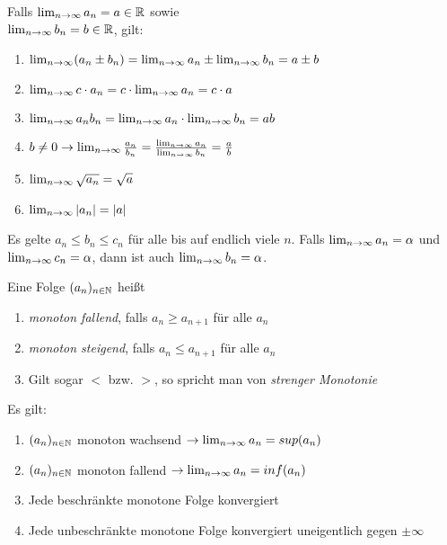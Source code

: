 \documentclass[]{article}
\begin{document}
\begin{satz}
	Falls $\lim_{n \rightarrow \infty} a_n = a \in \mathbb{R}$ sowie \\ $\lim_{n \rightarrow \infty} b_n = b \in \mathbb{R}$, gilt:
	\begin{enumerate}[noitemsep]
		\item $\lim_{n \rightarrow \infty} (a_n \pm b_n) = \lim_{n \rightarrow \infty} a_n \pm \lim_{n \rightarrow \infty} b_n = a \pm b $
		\item $\lim_{n \rightarrow \infty} c \cdot a_n = c \cdot \lim_{n \rightarrow \infty} a_n = c \cdot a  $
		\item $\lim_{n \rightarrow \infty} a_nb_n = \lim_{n \rightarrow \infty} a_n \cdot \lim_{n \rightarrow \infty} b_n = ab  $
		\item $b \neq 0 \rightarrow\lim_{n \rightarrow \infty} \frac{a_n}{b_n} = \frac{\lim_{n \rightarrow \infty} a_n}{\lim_{n \rightarrow \infty} b_n} = \frac{a}{b} $
		\item $\lim_{n \rightarrow \infty} \sqrt{a_n} = \sqrt{a} $
		\item $\lim_{n \rightarrow \infty} |a_n| = |a| $
	\end{enumerate}
\end{satz}

\begin{satz}[Einschließungsregel]
	Es gelte $a_n \leq b_n \leq c_n$ für alle bis auf endlich viele $n$. Falls $\lim_{n \rightarrow \infty} a_n = \alpha$ und $\lim_{n \rightarrow \infty} c_n = \alpha $, dann ist auch $\lim_{n \rightarrow \infty} b_n = \alpha$.
\end{satz}

\begin{definition}
	Eine Folge $(a_{n})_{n \in \mathbb{N}}$ heißt
	\begin{enumerate}[noitemsep]
		\item \emph{monoton fallend}, falls $a_n \geq a_{n+1}$ für alle $a_n$
		\item \emph{monoton steigend}, falls $a_n \leq a_{n+1}$ für alle $a_n$
		\item Gilt sogar $<$ bzw. $>$, so spricht man von \emph{strenger Monotonie}
	\end{enumerate}
\end{definition}

\begin{satz}
	Es gilt:
	\begin{enumerate}[noitemsep]
		\item $(a_{n})_{n \in \mathbb{N}}$ monoton wachsend $\rightarrow \lim_{n \rightarrow \infty} a_n = sup(a_n)$
		\item $(a_{n})_{n \in \mathbb{N}}$ monoton fallend $\rightarrow \lim_{n \rightarrow \infty} a_n = inf(a_n)$
		\item Jede beschränkte monotone Folge konvergiert
		\item Jede unbeschränkte monotone Folge konvergiert uneigentlich gegen $\pm \infty$
	\end{enumerate}
\end{satz}
\end{document}
